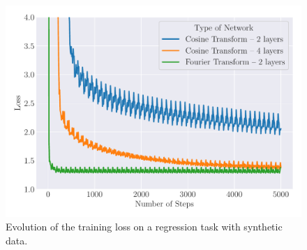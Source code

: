 

\begin{figure}[ht]
   \centering
   \includegraphics[width=\scalefigure\textwidth]{figures/main/ch4-diagonal_circulant/acdc_regression.pdf}
   \caption{Evolution of the training loss on a regression task with synthetic data.}
   \label{figure:ch4-acdc_regression}
\end{figure}

